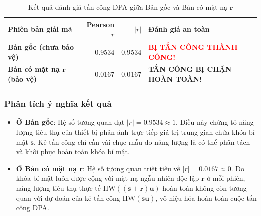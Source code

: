 \documentclass[../LuanVan.tex]{subfiles}
\begin{document}
\begin{table}[H]
\centering
\caption{Kết quả đánh giá tấn công DPA giữa Bản gốc và Bản có mặt nạ $\mathbf{r}$}
\label{tab:dpa_result}
\begin{tabular}{l r r l}
\toprule
\textbf{Phiên bản giải mã} & \textbf{Pearson $r$} & \textbf{$|r|$} & \textbf{Đánh giá an toàn} \\
\midrule
\textbf{Bản gốc (chưa bảo vệ)} & 0.9534 & 0.9534 & \textcolor{red}{\textbf{BỊ TẤN CÔNG THÀNH CÔNG!}} \\
\textbf{Bản có mặt nạ $\mathbf{r}$ (bảo vệ)} & $-$0.0167 & 0.0167 & \textcolor{green!60!black}{\textbf{TẤN CÔNG BỊ CHẶN HOÀN TOÀN!}} \\
\bottomrule
\end{tabular}
\end{table}

\begin{center}
\end{center}

\subsubsection{Phân tích ý nghĩa kết quả}
\begin{itemize}[leftmargin=2cm]
    \item \textbf{Ở Bản gốc}: Hệ số tương quan đạt $|r| = 0.9534 \approx 1$. Điều này chứng tỏ năng lượng tiêu thụ của thiết bị phản ánh trực tiếp giá trị trung gian chứa khóa bí mật $\mathbf{s}$. Kẻ tấn công chỉ cần vài chục mẫu đo năng lượng là có thể phân tách và khôi phục hoàn toàn khóa bí mật.
    \item \textbf{Ở Bản có mặt nạ $\mathbf{r}$}: Hệ số tương quan triệt tiêu về $|r| = 0.0167 \approx 0$. Do khóa bí mật luôn được cộng với mặt nạ ngẫu nhiên độc lập $\mathbf{r}$ ở mỗi phiên, năng lượng tiêu thụ thực tế $\text{HW}((\mathbf{s}+\mathbf{r})\mathbf{u})$ hoàn toàn không còn tương quan với dự đoán của kẻ tấn công $\text{HW}(\mathbf{s}\mathbf{u})$, vô hiệu hóa hoàn toàn cuộc tấn công DPA.
\end{itemize}

\end{document}
